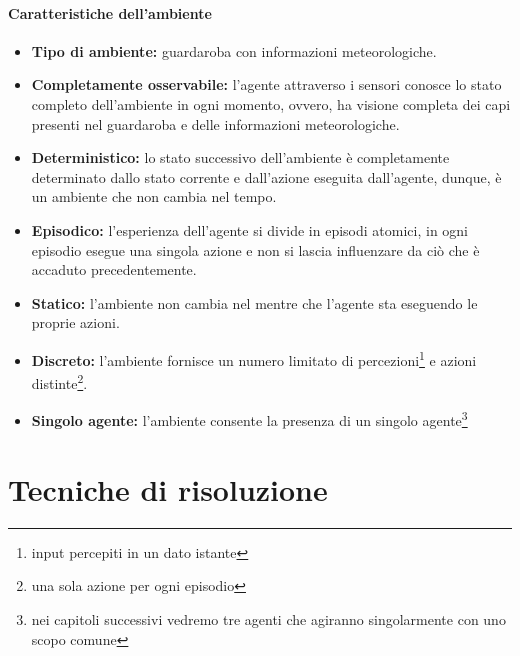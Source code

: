 \documentclass[a4paper, 11pt, oneside]{report}
\begin{document}
            \subsection{Caratteristiche dell'ambiente}
                \begin{itemize}
                    \item \textbf{Tipo di ambiente:} guardaroba con informazioni meteorologiche.
                    \item \textbf{Completamente osservabile:} l'agente attraverso i sensori conosce lo stato
                    completo dell'ambiente in ogni momento, ovvero, ha visione completa dei capi presenti nel guardaroba
                    e delle informazioni meteorologiche.
                    \item \textbf{Deterministico:} lo stato successivo dell'ambiente è completamente determinato dallo
                    stato corrente e dall'azione eseguita dall'agente, dunque, è un ambiente che non cambia nel tempo.
                    \item \textbf{Episodico:} l'esperienza dell'agente si divide in episodi atomici, in ogni episodio
                    esegue una singola azione e non si lascia influenzare da ciò che è accaduto precedentemente.
                    \item \textbf{Statico:} l'ambiente non cambia nel mentre che l'agente sta eseguendo le proprie azioni.
                    \item \textbf{Discreto:} l'ambiente fornisce un numero limitato di percezioni\footnote{input percepiti
                    in un dato istante} e azioni distinte\footnote{una sola azione per ogni episodio}.
                    \item \textbf{Singolo agente:} l'ambiente consente la presenza di un singolo agente\footnote{nei
                    capitoli successivi vedremo tre agenti che agiranno singolarmente con uno scopo comune}
                \end{itemize}

    \part{Tecniche di risoluzione}
\end{document}
